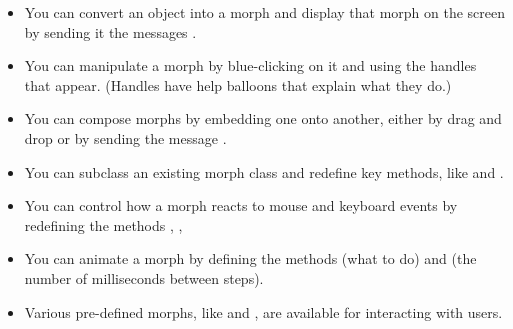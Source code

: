 \documentclass[a4paper,10pt,twoside]{book}
\begin{document}
\begin{itemize}
  \item You can convert an object into a morph and display that morph on the screen by sending it the messages .
  \item You can manipulate a morph by blue-clicking on it and using the handles that appear.
  	(Handles have help balloons that explain what they do.)
  \item You can compose morphs by embedding one onto another, either by drag and drop or by sending the message .
  \item You can subclass an existing morph class and redefine key methods, like  and .
  \item You can control how a morph reacts to mouse and keyboard events by redefining the methods , , \etc
  \item You can animate a morph by defining the methods  (what to do) and  (the number of milliseconds between steps).
  \item Various pre-defined morphs, like  and , are available for interacting with users.
\end{itemize}

\ifx\wholebook\relax\else
\end{document}
